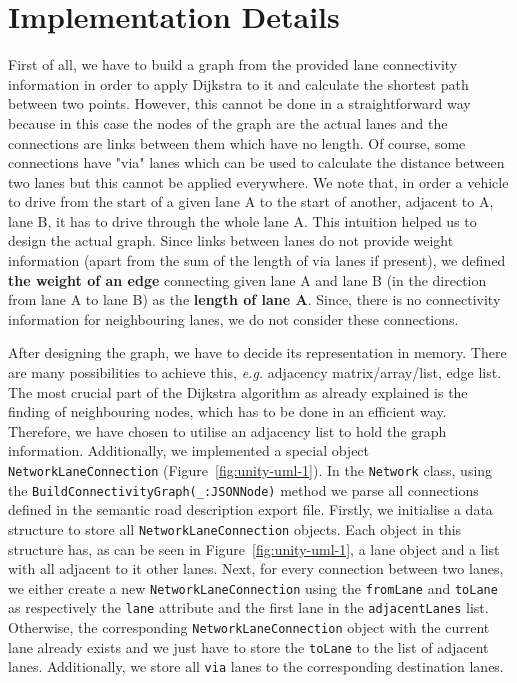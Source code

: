 \section{Implementation Details}
First of all, we have to build a graph from the provided lane connectivity information in order to apply Dijkstra to it and calculate the shortest path between two points. However, this cannot be done in a straightforward way because in this case the nodes of the graph are the actual lanes and the connections are links between them which have no length. Of course, some connections have "via" lanes which can be used to calculate the distance between two lanes but this cannot be applied everywhere. We note that, in order a vehicle to drive from the start of a given lane A to the start of another, adjacent to A, lane B, it has to drive through the whole lane A. This intuition helped us to design the actual graph. Since links between lanes do not provide weight information (apart from the sum of the length of via lanes if present), we defined \textbf{the weight of an edge} connecting given lane A and lane B (in the direction from lane A to lane B) as the \textbf{length of lane A}. Since, there is no connectivity information for neighbouring lanes, we do not consider these connections.

After designing the graph, we have to decide its representation in memory. There are many possibilities to achieve this, \emph{e.g.} adjacency matrix/array/list, edge list. The most crucial part of the Dijkstra algorithm as already explained is the finding of neighbouring nodes, which has to be done in an efficient way. Therefore, we have chosen to utilise an adjacency list to hold the graph information. Additionally, we implemented a special object \texttt{NetworkLaneConnection} (Figure~\ref{fig:unity-uml-1}). In the \texttt{Network} class, using the \texttt{BuildConnectivityGraph(\_:\;JSONNode)} method we parse all connections defined in the semantic road description export file. Firstly, we initialise a data structure to store all \texttt{NetworkLaneConnection} objects. Each object in this structure has, as can be seen in Figure~\ref{fig:unity-uml-1}, a lane object and a list with all adjacent to it other lanes. Next, for every connection between two lanes, we either create a new \texttt{NetworkLaneConnection} using the \texttt{fromLane} and \texttt{toLane} as respectively the \texttt{lane} attribute and the first lane in the \texttt{adjacentLanes} list. Otherwise, the corresponding \texttt{NetworkLaneConnection} object with the current lane already exists and we just have to store the \texttt{toLane} to the list of adjacent lanes. Additionally, we store all \texttt{via} lanes to the corresponding destination lanes.

